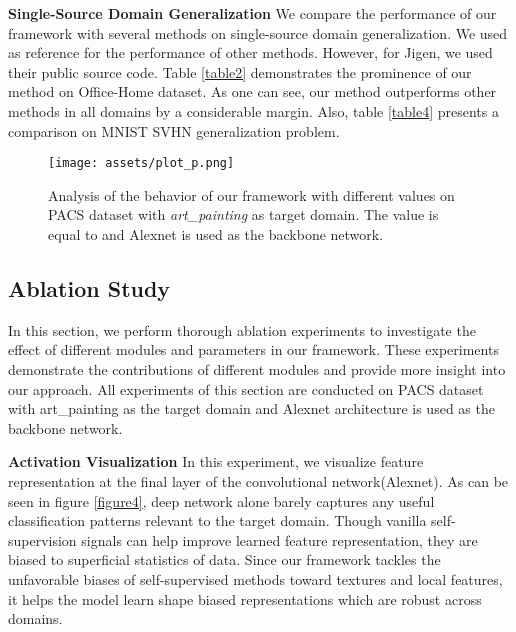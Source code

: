 \documentclass[10pt,twocolumn,letterpaper]{article}
\begin{document}
\vspace{2mm}
\noindent
\textbf{Single-Source Domain Generalization}\quad
We compare the performance of our framework with several methods on single-source domain generalization. We used \cite{roy2019unsupervised} as reference for the performance of other methods. However, for Jigen\cite{carlucci2019domain}, we used their public source code. Table \ref{table2} demonstrates the prominence of our method on Office-Home\cite{venkateswara2017deep} dataset. As one can see, our method outperforms other methods in all domains by a considerable margin. Also, table \ref{table4} presents a comparison on MNIST  SVHN generalization problem.

\begin{figure}[t!]
	\begin{center}
		\texttt{[image: assets/plot\_p.png]}
	\end{center}
	\caption{Analysis of the behavior of our framework with different  values on PACS dataset \cite{li2017deeper} with \textit{art\_painting} as target domain. The  value is equal to  and Alexnet is used as the backbone network.}
	\label{figure5}
\end{figure}

\subsection{Ablation Study}


In this section, we perform thorough ablation experiments to investigate the effect of different modules and parameters in our framework. These experiments demonstrate the contributions of different modules and provide more insight into our approach.
All experiments of this section are conducted on PACS dataset \cite{li2017deeper} with art\_painting as the target domain and Alexnet architecture is used as the backbone network.

\vspace{2mm}
\noindent
\textbf{Activation Visualization}\quad 
In this experiment, we visualize feature representation at the final layer of the convolutional network(Alexnet). As can be seen in figure \ref{figure4}, deep network alone barely captures any useful classification patterns relevant to the target domain. Though vanilla self-supervision signals can help improve learned feature representation, they are biased to superficial statistics of data. Since our framework tackles the unfavorable biases of self-supervised methods toward textures and local features, it helps the model learn shape biased representations which are robust across domains.
\end{document}
